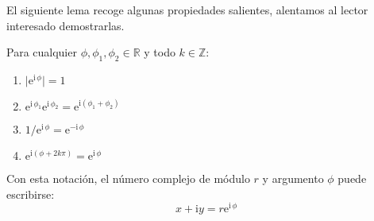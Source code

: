   El siguiente lema recoge algunas propiedades salientes,
  alentamos al lector interesado demostrarlas.
  \begin{lemma}
    \label{lem:imaginary-exponential}
    Para cualquier \(\phi, \phi_1, \phi_2 \in \mathbb{R}\)
    y todo \(k \in \mathbb{Z}\):
    \begin{enumerate}[label=(\roman*), ref=(\roman*)]
    \item
      \(\lvert \mathrm{e}^{\mathrm{i} \, \phi} \rvert
	  = 1\)
    \item
      \(\mathrm{e}^{\mathrm{i} \, \phi_1}
	\mathrm{e}^{\mathrm{i} \, \phi_2}
	  = \mathrm{e}^{\mathrm{i} (\phi_1 + \phi_2)}\)
    \item
      \(1 / \mathrm{e}^{\mathrm{i} \, \phi}
	  = \mathrm{e}^{- \mathrm{i} \, \phi}\)
    \item
      \(\mathrm{e}^{\mathrm{i} (\phi + 2 k \pi)}
	  = \mathrm{e}^{\mathrm{i} \, \phi}\)
    \end{enumerate}
  \end{lemma}
  Con esta notación,
  el número complejo de módulo \(r\) y argumento \(\phi\)
  puede escribirse:
  \begin{equation}
    \label{eq:complex-exponential-notation}
    x + \mathrm{i} y
      = r \mathrm{e}^{\mathrm{i} \, \phi}
  \end{equation}

